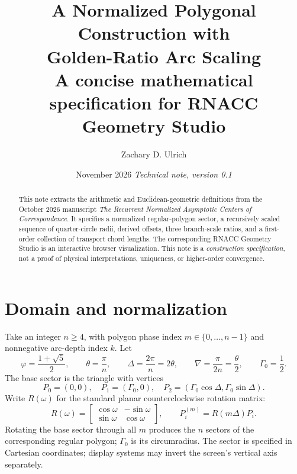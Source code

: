 \documentclass[10pt,letterpaper]{article}
\title{\vspace{-1.5em}\textbf{A Normalized Polygonal Construction with\\Golden-Ratio Arc Scaling}\\\large A concise mathematical specification for RNACC Geometry Studio}
\author{Zachary D. Ulrich}
\date{November 2026 \quad \textit{Technical note, version 0.1}}
\begin{document}
\maketitle
\vspace{-1em}
\begin{abstract}
This note extracts the arithmetic and Euclidean-geometric definitions from the October 2026 manuscript \emph{The Recurrent Normalized Asymptotic Centers of Correspondence}. It specifies a normalized regular-polygon sector, a recursively scaled sequence of quarter-circle radii, derived offsets, three branch-scale ratios, and a first-order collection of transport chord lengths. The corresponding RNACC Geometry Studio is an interactive browser visualization. This note is a \emph{construction specification}, not a proof of physical interpretations, uniqueness, or higher-order convergence.
\end{abstract}

\section{Domain and normalization}
Take an integer $n\geq4$, with polygon phase index $m\in\{0,\dots,n-1\}$ and nonnegative arc-depth index $k$. Let
\begin{equation}
\varphi=\frac{1+\sqrt{5}}2,\qquad \theta=\frac{\pi}{n},\qquad
\Delta=\frac{2\pi}{n}=2\theta,\qquad \nabla=\frac{\pi}{2n}=\frac\theta2,\qquad \Gamma_0=\frac12.
\end{equation}
The base sector is the triangle with vertices
\begin{equation}
P_0=(0,0),\quad P_1=(\Gamma_0,0),\quad
P_2=(\Gamma_0\cos\Delta,\Gamma_0\sin\Delta).
\end{equation}
Write $R(\omega)$ for the standard planar counterclockwise rotation matrix:
\begin{equation}
R(\omega)=\begin{bmatrix}\cos\omega&-\sin\omega\\\sin\omega&\cos\omega\end{bmatrix},\qquad
P_i^{(m)}=R(m\Delta)P_i.
\end{equation}
Rotating the base sector through all $m$ produces the $n$ sectors of the corresponding regular polygon; $\Gamma_0$ is its circumradius. The sector is specified in Cartesian coordinates; display systems may invert the screen's vertical axis separately.
\end{document}

